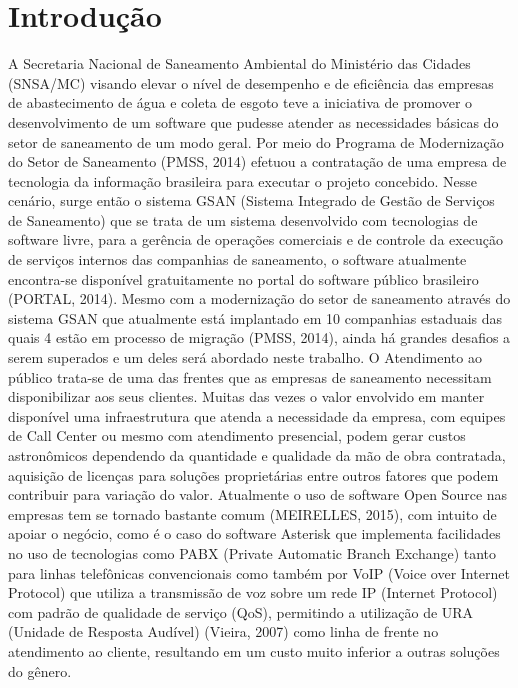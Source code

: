 \chapter*[Introdução]{Introdução}

A Secretaria Nacional de Saneamento Ambiental do Ministério das Cidades (SNSA/MC) visando elevar o nível de desempenho e de eficiência das empresas de abastecimento de água e coleta de esgoto teve a iniciativa de promover o desenvolvimento de um software que pudesse atender as necessidades básicas do setor de saneamento de um modo geral. Por meio do Programa de Modernização do Setor de Saneamento (PMSS, 2014) efetuou a contratação de uma empresa de tecnologia da informação brasileira para executar o projeto concebido.  Nesse cenário, surge então o sistema GSAN (Sistema Integrado de Gestão de Serviços de Saneamento) que se trata de um sistema desenvolvido com tecnologias de software livre, para a gerência de operações comerciais e de controle da execução de serviços internos das companhias de saneamento, o software atualmente encontra-se disponível gratuitamente no portal do software público brasileiro (PORTAL, 2014). Mesmo com a modernização do setor de saneamento através do sistema GSAN que atualmente está implantado em 10 companhias estaduais das quais 4 estão em processo de migração (PMSS, 2014), ainda há grandes desafios a serem superados e um deles será abordado neste trabalho.
O Atendimento ao público trata-se de uma das frentes que as empresas de saneamento necessitam disponibilizar aos seus clientes. Muitas das vezes o valor envolvido em manter disponível uma infraestrutura que atenda a necessidade da empresa, com equipes de Call Center ou mesmo com atendimento presencial, podem gerar custos astronômicos dependendo da quantidade e qualidade da mão de obra contratada, aquisição de licenças para soluções proprietárias entre outros fatores que podem contribuir para variação do valor. Atualmente o uso de software Open Source nas empresas tem se tornado bastante comum (MEIRELLES, 2015), com intuito de apoiar o negócio, como é o caso do software Asterisk que implementa facilidades no uso de tecnologias como PABX (Private Automatic Branch Exchange)  tanto para linhas telefônicas convencionais como também por VoIP (Voice over Internet Protocol) que utiliza a transmissão de voz sobre um rede IP (Internet Protocol) com padrão de qualidade de serviço (QoS), permitindo a utilização de URA (Unidade de Resposta Audível) (Vieira, 2007) como linha de frente no atendimento ao cliente, resultando em um custo muito inferior a outras soluções do gênero.


